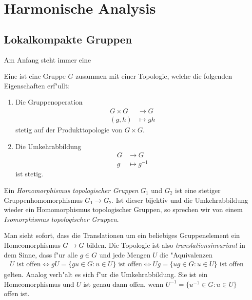 \section{Harmonische Analysis}

\subsection{Lokalkompakte Gruppen}
Am Anfang steht immer eine
\begin{defi}
	Eine  ist eine Gruppe $G$ zusammen mit einer Topologie, welche die folgenden Eigenschaften erf"ullt:
		\begin{enumerate}[label=(\roman*)] %
			\item Die Gruppenoperation
				\begin{align*}
					G \times G &\longrightarrow G\\
					(g,h) &\longmapsto gh
				\end{align*}
			stetig auf der Produkttopologie von $G \times G$.
			\item Die Umkehrabbildung
				\begin{align*}
					G &\longrightarrow G\\
					g &\longmapsto g^{-1}
				\end{align*}
				ist stetig.
		\end{enumerate}
	Ein \emph{Homomorphismus topologischer Gruppen} $G_1$ und $G_2$ ist eine stetiger Gruppenhomomorphismus $G_1 \to G_2$.
	Ist dieser bijektiv und die Umkehrabbildung wieder ein Homomorphismus topologischer Gruppen, so sprechen wir von einem \emph{Isomorphismus topologischer Gruppen}.
\end{defi}
	
	Man sieht sofort, dass die Translationen um ein beliebiges Gruppenelement ein Homeomorphismus $G \to G$ bilden.
	Die Topologie ist also \emph{translationsinvariant} in dem Sinne, dass f"ur alle $g \in G$ und jede Mengen $U$ die "Aquivalenzen
	\begin{align*}
		U \text{ ist offen} \Leftrightarrow gU = \{gu \in G: u\in U\} \text{ ist offen} \Leftrightarrow Ug = \{ug \in G: u\in U\} \text{ ist offen}
	\end{align*}
	gelten.
	Analog verh"alt es sich f"ur die Umkehrabbildung. Sie ist ein Homeomorphismus und $U$ ist genau dann offen, wenn $U^{-1}=\{u^{-1}\in G: u \in U\}$ offen ist.
	
